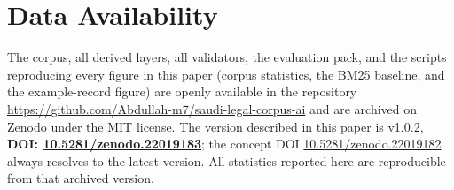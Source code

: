 \documentclass[11pt]{article}
\begin{document}
\section*{Data Availability}

The corpus, all derived layers, all validators, the evaluation pack, and
the scripts reproducing every figure in this paper (corpus statistics, the
BM25 baseline, and the example-record figure) are openly available in the
repository \url{https://github.com/Abdullah-m7/saudi-legal-corpus-ai} and are
archived on Zenodo under the MIT license. The version described in this
paper is v1.0.2, \textbf{DOI:
\href{https://doi.org/10.5281/zenodo.22019183}{10.5281/zenodo.22019183}};
the concept DOI
\href{https://doi.org/10.5281/zenodo.22019182}{10.5281/zenodo.22019182}
always resolves to the latest version. All statistics reported here are
reproducible from that archived version.


\end{document}
